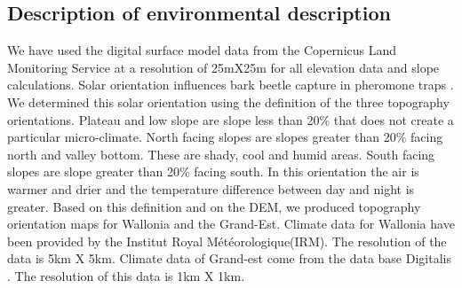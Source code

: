 \documentclass[3p,procedia]{elsarticle}
\begin{document}



	



\subsection{Description of environmental description}


We have used the digital surface model data from the Copernicus Land Monitoring Service \citep{DEM_copernicus}  at a resolution of 25mX25m for all elevation data and slope calculations.
Solar orientation influences bark beetle capture in pheromone traps \citep{AFR64}.
We determined this solar orientation using the \cite{Delvaux_galoux} definition of the three topography orientations.
Plateau and low slope are slope less than  20\% that does not create a particular micro-climate. 
North facing slopes are slopes greater than  20\% facing north and valley bottom. 
These are shady, cool and humid areas. 
South facing slopes are slope greater than  20\% facing south. 
In this orientation the air is warmer and drier and the temperature difference between day and night is greater.
Based on this definition and on the DEM, we produced topography orientation  maps for Wallonia and the Grand-Est.
Climate data for Wallonia have been provided by the Institut Royal Météorologique(IRM). The resolution of the data is 5km X 5km. Climate data of  Grand-est come from the data base Digitalis \citep{piedallu_presentation_2014}. The resolution of this data is 1km X 1km.
\end{document}
